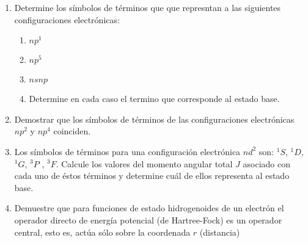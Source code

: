 \documentclass[]{article}
\begin{document}
\begin{enumerate}
\item Determine los símbolos de términos que que represntan a las siguientes configuraciones electrónicas:
  \begin{enumerate}
  \item $np^1$
  \item $np^5$
  \item $nsnp$
  \item Determine en cada caso el termino que corresponde al estado base.
  \end{enumerate}
\item Demostrar que los símbolos de términos de las configuraciones  electrónicas $np^2$ y $np^4$
 coinciden.
\item Los símbolos de términos para una configuración electrónica $nd^2$ son: $^1S$, $^1D$, $^1G$, $^3P$ , $^3F$. Calcule los valores del momento angular total $J$ asociado con cada uno de éstos términos y determine cuál de ellos representa al estado base.
\item Demuestre que para funciones de estado hidrogenoides de un electrón el operador directo de energía potencial (de Hartree-Fock) es un operador central, esto es, actúa sólo  sobre la coordenada $r$ (distancia)
\end{enumerate}
\end{document}
